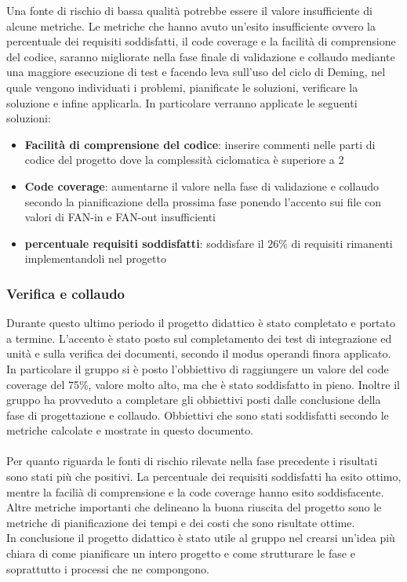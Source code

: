 Una fonte di rischio di bassa qualità potrebbe essere il valore insufficiente di alcune metriche. Le metriche che hanno avuto un'esito insufficiente ovvero la percentuale dei requisiti soddisfatti, il code coverage e la facilità di comprensione del codice, saranno migliorate
nella fase finale di validazione e collaudo mediante una maggiore esecuzione di test e facendo leva sull'uso del ciclo di Deming, nel quale
vengono individuati i problemi, pianificate le soluzioni, verificare la soluzione e infine applicarla.
In particolare  verranno applicate le seguenti soluzioni:

\newpage
\begin{itemize}
    \item \textbf{Facilità di comprensione del codice}: inserire commenti nelle parti di codice del progetto dove la complessità ciclomatica è superiore a 2
    \item \textbf{Code coverage}: aumentarne il valore nella fase di validazione e collaudo secondo la pianificazione della prossima fase  ponendo l'accento sui file con valori di FAN-in e FAN-out insufficienti
    \item \textbf{percentuale requisiti soddisfatti}: soddisfare il 26\% di requisiti rimanenti implementandoli nel progetto
\end{itemize} 

\subsubsection{Verifica e collaudo}

Durante questo ultimo periodo il progetto didattico è stato completato e portato a termine.
L'accento è stato posto sul completamento dei test di integrazione ed unità e sulla  verifica dei documenti, secondo il modus operandi finora applicato.
In particolare il gruppo si è posto l'obbiettivo di raggiungere un valore del code coverage del 75\%, valore molto alto, ma che è stato soddisfatto in pieno.
Inoltre il gruppo ha provveduto a completare gli obbiettivi posti dalle conclusione della fase di progettazione e collaudo.
Obbiettivi che sono stati soddisfatti secondo le metriche calcolate e mostrate in questo documento.\\
 \\
Per quanto riguarda le fonti di rischio rilevate nella fase precedente i risultati sono stati più che positivi.
La percentuale dei requisiti soddisfatti ha esito ottimo, mentre la facilià di comprensione e la code coverage hanno esito soddisfacente.
 Altre metriche importanti che delineano la buona riuscita del progetto sono le metriche di pianificazione dei tempi e dei costi che sono risultate ottime.\\
 In conclusione il progetto didattico è stato utile al gruppo nel crearsi un'idea più chiara di come pianificare un intero progetto e come strutturare le fase e soprattutto i processi che ne compongono.
 